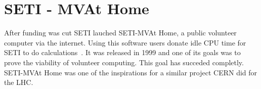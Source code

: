 \section{SETI - MVAt Home}

After funding was cut SETI lauched SETI-MVAt Home, a public volunteer computer 
via the internet. Using this software users donate idle CPU time for SETI to do 
calculations~\cite{www-hid-sp18-601-sathome-about}. It was released in 1999 and 
one of its goals was to prove the viability of volunteer computing. This goal 
has succeded completly. SETI-MVAt 
Home was one of the inspirations for a similar project CERN did for the LHC.